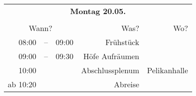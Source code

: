 \documentclass{scrartcl}
\begin{document}
\begin{tabular}{rcrrr}
\multicolumn{5}{c}{\textbf{\huge{Montag 20.05.}}}\\
\\
\multicolumn{3}{c}{Wann?} & Was? & Wo? \\
\hline
08:00&--&09:00 & Frühstück \\ 
09:00&--&09:30 & Höfe Aufräumen\\
10:00&& & Abschlussplenum  & Pelikanhalle \\ 
ab 10:20&&& Abreise\\
\end{tabular}
\end{document}
